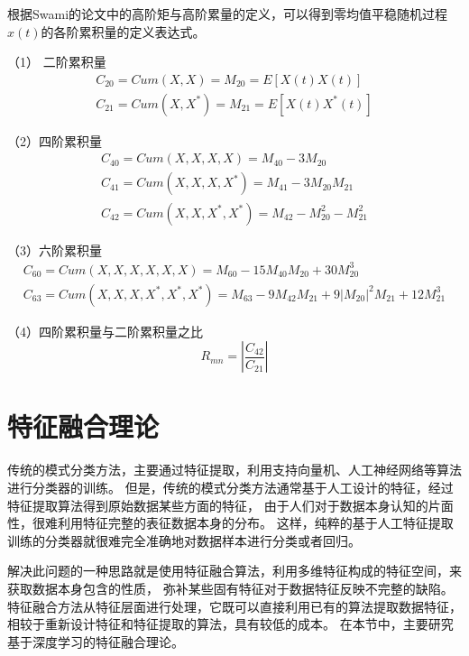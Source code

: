根据Swami\cite{swami2000hierarchical}的论文中的高阶矩与高阶累量的定义，可以得到零均值平稳随机过程$x(t)$的各阶累积量的定义表达式。\par

（1） 二阶累积量
\begin{equation}
\label{eqt_4_10}
\begin{aligned}
C_{20} = Cum(X, X) = M_{20} = E[X(t)X(t)]\\
C_{21} = Cum(X, X^*) = M_{21} = E[X(t)X^*(t)]	
\end{aligned}
\end{equation}

（2）四阶累积量
\begin{equation}
\label{eqt_4_11}
\begin{aligned}
C_{40}=Cum(X, X, X, X) = M_{40} - 3M_{20}\\
C_{41}=Cum(X, X, X, X^*) = M_{41} - 3M_{20}M_{21}\\
C_{42}=Cum(X, X, X^*, X^*) = M_{42} - M_{20}^2 - M_{21}^2
\end{aligned}
\end{equation}

（3）六阶累积量
\begin{equation}
\label{eqt_4_12}
\begin{aligned}
C_{60}=Cum(X, X, X, X, X, X) = M_{60} - 15M_{40}M_{20} + 30M_{20}^3\\
C_{63}=Cum(X, X, X, X^*, X^*, X^*) = M_{63} - 9M_{42}M_{21} 
+ 9\left|M_{20}\right|^2M_{21} + 12M_{21}^3
\end{aligned}
\end{equation}

（4）四阶累积量与二阶累积量之比
\begin{equation}
\label{eqt_4_13}
R_{mn} = |\frac{C_{42}}{C_{21}}|
\end{equation}

\section{特征融合理论}
传统的模式分类方法，主要通过特征提取，利用支持向量机、人工神经网络等算法进行分类器的训练。 
但是，传统的模式分类方法通常基于人工设计的特征，经过特征提取算法得到原始数据某些方面的特征，
由于人们对于数据本身认知的片面性，很难利用特征完整的表征数据本身的分布。
这样，纯粹的基于人工特征提取训练的分类器就很难完全准确地对数据样本进行分类或者回归。\par

解决此问题的一种思路就是使用特征融合算法，利用多维特征构成的特征空间，来获取数据本身包含的性质，
弥补某些固有特征对于数据特征反映不完整的缺陷。
特征融合方法从特征层面进行处理，它既可以直接利用已有的算法提取数据特征，
相较于重新设计特征和特征提取的算法，具有较低的成本。
在本节中，主要研究基于深度学习的特征融合理论。\par

